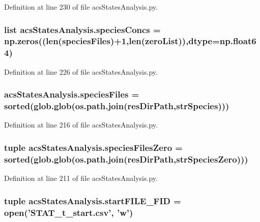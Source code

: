 Definition at line 230 of file acs\-States\-Analysis.\-py.

\hypertarget{a00130_a2377568425051a7511b51f7c50662ba1}{
\subsubsection[{species\-Concs}]{\setlength{\rightskip}{0pt plus 5cm}list acs\-States\-Analysis.\-species\-Concs = np.\-zeros((len({\bf species\-Files})+1,len({\bf zero\-List})),dtype=np.\-float64)}}\label{a00130_a2377568425051a7511b51f7c50662ba1}


Definition at line 226 of file acs\-States\-Analysis.\-py.

\hypertarget{a00130_af3291bd263282353dd4a12ee38c08cae}{
\subsubsection[{species\-Files}]{\setlength{\rightskip}{0pt plus 5cm}acs\-States\-Analysis.\-species\-Files = sorted(glob.\-glob(os.\-path.\-join({\bf res\-Dir\-Path},{\bf str\-Species})))}}\label{a00130_af3291bd263282353dd4a12ee38c08cae}


Definition at line 216 of file acs\-States\-Analysis.\-py.

\hypertarget{a00130_a5584994da277e7798c904342dff18427}{
\subsubsection[{species\-Files\-Zero}]{\setlength{\rightskip}{0pt plus 5cm}tuple acs\-States\-Analysis.\-species\-Files\-Zero = sorted(glob.\-glob(os.\-path.\-join({\bf res\-Dir\-Path},{\bf str\-Species\-Zero})))}}\label{a00130_a5584994da277e7798c904342dff18427}


Definition at line 211 of file acs\-States\-Analysis.\-py.

\hypertarget{a00130_a0239a9dcc4900463a0c19557bec23521}{
\subsubsection[{start\-F\-I\-L\-E\-\_\-\-F\-I\-D}]{\setlength{\rightskip}{0pt plus 5cm}tuple acs\-States\-Analysis.\-start\-F\-I\-L\-E\-\_\-\-F\-I\-D = open('S\-T\-A\-T\-\_\-t\-\_\-start.\-csv', 'w')}}\label{a00130_a0239a9dcc4900463a0c19557bec23521}


